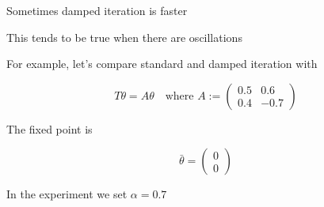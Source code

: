 \documentclass[xcolor=dvipsnames]{beamer}  %
\newcommand{\1}{\mathbbm 1}
\begin{document}
\begin{frame}
    Sometimes damped iteration is faster

    \vspace{1em}

    This tends to be true when there are oscillations

    \vspace{1em}
    \vspace{1em}
    For example, let's compare standard and damped iteration with
    \vspace{1em}

    \begin{equation*}
        T \theta = A \theta
        \quad \text{where } A := 
        \begin{pmatrix}
            0.5 & 0.6 \\
            0.4 & -0.7
        \end{pmatrix}
    \end{equation*}

    The fixed point is 

    \begin{equation*}
        \bar \theta = 
        \begin{pmatrix}
            0 \\
            0
        \end{pmatrix}
    \end{equation*}


    In the experiment we set $\alpha = 0.7$

\end{frame}

\begin{frame}

    \begin{figure}
        \centering
    \end{figure}
    
\end{frame}
\end{document}
